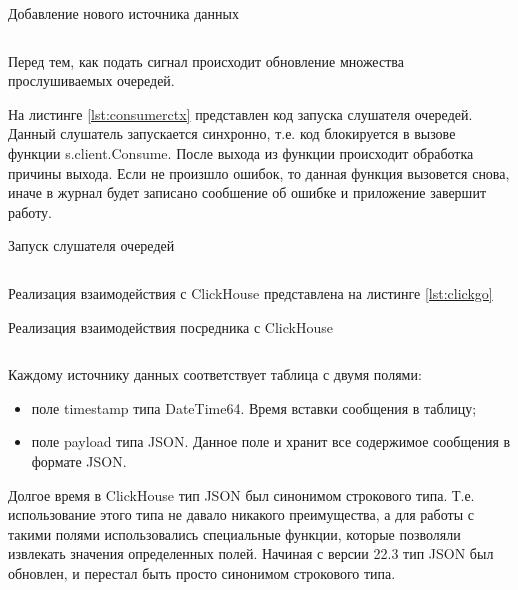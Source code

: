 \documentclass[14pt, russian]{scrartcl}
\begin{document}
\begin{listing}[H]
	\caption{Добавление нового источника данных}
	\label{lst:ctxclosing}
	\inputminted[style=bw, frame=single,fontsize = \footnotesize, linenos=false, xleftmargin = 1.5em]{shell}{./listings/contextclose.go}
\end{listing}

Перед тем, как подать сигнал происходит обновление множества
прослушиваемых очередей.

На листинге \ref{lst:consumerctx} представлен код запуска слушателя очередей.
Данный слушатель запускается синхронно, т.е. код блокируется в
вызове функции s.client.Consume. После выхода
из функции происходит обработка причины выхода. Если
не произшло ошибок, то данная функция вызовется снова, иначе
в журнал будет записано сообшение об ошибке и приложение завершит работу.

\begin{listing}[H]
	\caption{Запуск слушателя очередей}
	\label{lst:consumerctx}
	\inputminted[style=bw, frame=single,fontsize = \footnotesize, linenos=false, xleftmargin = 1.5em]{shell}{./listings/consumerctx.go}
\end{listing}


Реализация взаимодействия с ClickHouse представлена на листинге \ref{lst:clickgo}

\begin{listing}[H]
	\caption{Реализация взаимодействия посредника с ClickHouse}
	\label{lst:clickgo}
	\inputminted[breaklines=true, style=bw, frame=single,fontsize = \footnotesize, linenos=false, xleftmargin = 1.5em]{golang}{./listings/clickgo.go}
\end{listing}

Каждому источнику данных соответствует таблица с двумя полями:

\begin{itemize}
	\item поле timestamp типа DateTime64. Время вставки сообщения в таблицу;
	\item поле payload типа JSON. Данное поле и хранит все содержимое сообщения в формате JSON.
\end{itemize}

Долгое время в ClickHouse тип JSON \cite{JSON} был синонимом строкового типа. Т.е. использование этого типа
не давало никакого преимущества, а для работы с такими полями использовались специальные функции, которые
позволяли извлекать значения определенных полей.
Начиная с версии 22.3 тип JSON был обновлен, и перестал быть просто синонимом строкового типа.
\end{document}
